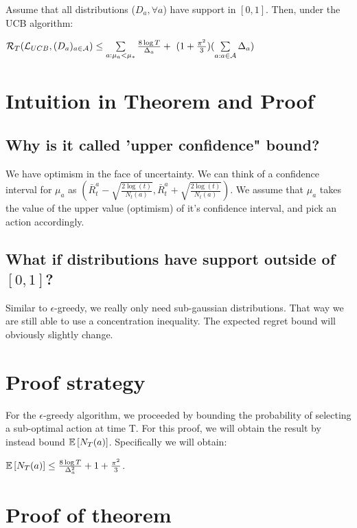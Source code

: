 \documentclass[11pt]{article}
\begin{document}
\begin{theorem}
Assume that all distributions ($D_a, \forall a$) have support in $[0,1]$. Then, under the UCB algorithm:

$\mathcal{R}_T(\mathcal{L}_{UCB}, (D_a)_{a \in \mathcal{A}}) \leq \sum\limits_{a: \mu_a < \mu_*} \frac{8\log T}{\Delta_a} + \ (1 + \frac{\pi^2}{3})(\sum\limits_{a: a \in \mathcal{A}} \Delta_a)$

\end{theorem}


\section{Intuition in Theorem and Proof}

\subsection{Why is it called 'upper confidence" bound?}

We have optimism in the face of uncertainty.  We can think of a confidence interval for $\mu_a$ as $(\bar R_t^a - \sqrt{\frac{2\log(t)}{N_t(a)}} , \bar R_t^a + \sqrt{\frac{2\log(t)}{N_t(a)}} )$.  We  assume that $\mu_a$ takes the value of the upper value (optimism)  of it's confidence interval, and pick an action accordingly.

\subsection{What if distributions have support outside of $[0,1]$?}

Similar to $\epsilon$-greedy, we really only need sub-gaussian distributions.  That way we are still able to use a concentration inequality.  The expected regret bound will obviously slightly change.

\section{Proof strategy}

For the $\epsilon$-greedy algorithm, we proceeded by bounding the probability of selecting a sub-optimal action at time T.  For this proof, we will obtain the result by instead bound $\mathbb{E}\left[ N_T(a) \right]$.  Specifically we will obtain:

$\mathbb{E}\left[ N_T(a) \right] \leq \frac{8 \log T}{\Delta_a^2} + 1 + \frac{\pi^2}{3}$.

\section{Proof of theorem}
\end{document}
